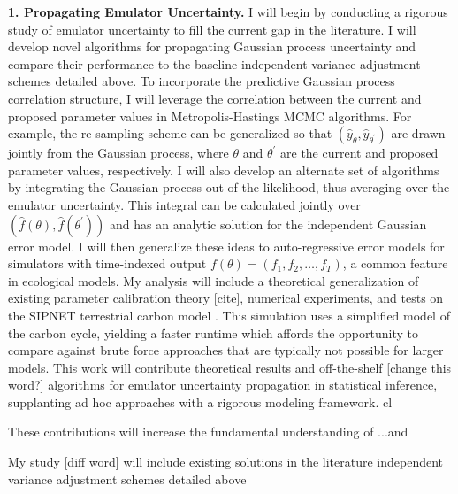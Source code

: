 \documentclass[12pt]{article}
\begin{document}
 \textbf{1. Propagating Emulator Uncertainty.} I will begin by conducting a rigorous study of emulator uncertainty to fill the current gap in the literature. I will develop novel algorithms for propagating Gaussian process uncertainty and compare their performance to the baseline independent variance adjustment schemes detailed above. To incorporate the predictive Gaussian process correlation structure, I will leverage the correlation between the current and proposed parameter values in Metropolis-Hastings MCMC algorithms. For example, the re-sampling scheme \cite{Fer} can be generalized so that 
 $(\hat{y}_{\theta}, \hat{y}_{\theta^\prime})$ are drawn jointly from the Gaussian process, where $\theta$ and $\theta^\prime$ are the current and proposed parameter values, respectively. I will also develop an alternate set of algorithms by integrating the Gaussian process out of the likelihood, thus averaging over the emulator uncertainty. This integral can be calculated jointly over $(\hat{f}(\theta), \hat{f}(\theta^\prime))$ and has an analytic solution for the independent Gaussian error model. I will then generalize these ideas to auto-regressive error models for simulators with time-indexed output $f(\theta) = (f_1, f_2, \dots, f_T)$, a common feature in ecological models. 
 My analysis will include a theoretical generalization of existing parameter calibration theory [cite], numerical experiments, and tests on the SIPNET terrestrial carbon model \cite{Fer}. This simulation uses a simplified model of the carbon cycle, yielding a faster runtime which affords the opportunity to compare against brute force approaches that are typically not possible for larger models. This work will contribute theoretical results and off-the-shelf [change this word?] algorithms for emulator uncertainty propagation in statistical inference, supplanting ad hoc approaches with a rigorous modeling framework. cl
 
 These contributions will increase the fundamental understanding of ...and 
 
 My study [diff word] will include existing solutions in the literature independent variance adjustment schemes detailed above
\end{document}
